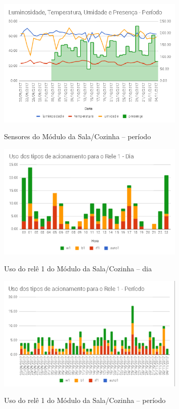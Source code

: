 \begin{figure}[H]
	\centering
	\caption{Sensores do Módulo da Sala/Cozinha -- período}
	\includegraphics[width=0.8\textwidth]{sensoresperiodoSalaCozinha}
	\label{fig:sensoresperiodoSalaCozinha}
\end{figure}

\begin{figure}[H]
	\centering
	\caption{Uso do relê 1 do Módulo da Sala/Cozinha -- dia}
	\includegraphics[width=0.8\textwidth]{usorele1salacozinhadia}
	\label{fig:usorele1salacozinhadia}
\end{figure}

\begin{figure}[H]
	\centering
	\caption{Uso do relê 1 do Módulo da Sala/Cozinha -- período}
	\includegraphics[width=0.8\textwidth]{usorele1salacozinhaperiodo}
	\label{fig:usorele1salacozinhaperiodo}
\end{figure}

